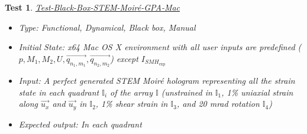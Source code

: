 \documentclass[12pt, titlepage]{article}
\newtheorem{Test}{Test}
\begin{document}
\begin{Test}\normalfont\underline{Test-Black-Box-STEM-Moir{\'e}-GPA-Mac}
\label{black_box_STEM_Moire_GPA-predif-Mac}
\begin{itemize}
\item Type: Functional, Dynamical, Black box, Manual
\item Initial State: x64 Mac OS X environment with all user inputs are predefined ($p,M_1,M_2,U,\overrightarrow{q_{n_1,m_1}},\overrightarrow{q_{n_2,m_2}}$) except $I_{\mathit{SMH}_\text{exp}}$ 
\item Input: A perfect generated STEM Moir{\'e} hologram representing all the strain state in each quadrant $\mathbb{I}_{i}$ of the array $\mathbb{I}$ (unstrained in $\mathbb{I}_{1}$, 1{\%} uniaxial strain along $\vec{u_x}$ and $\vec{u_y}$ in $\mathbb{I}_{2}$, 1{\%} shear strain in $\mathbb{I}_{3}$, and  20 mrad rotation $\mathbb{I}_{4}$)
\item Expected output: In each quadrant
\end{itemize}
\end{Test}
\end{document}
